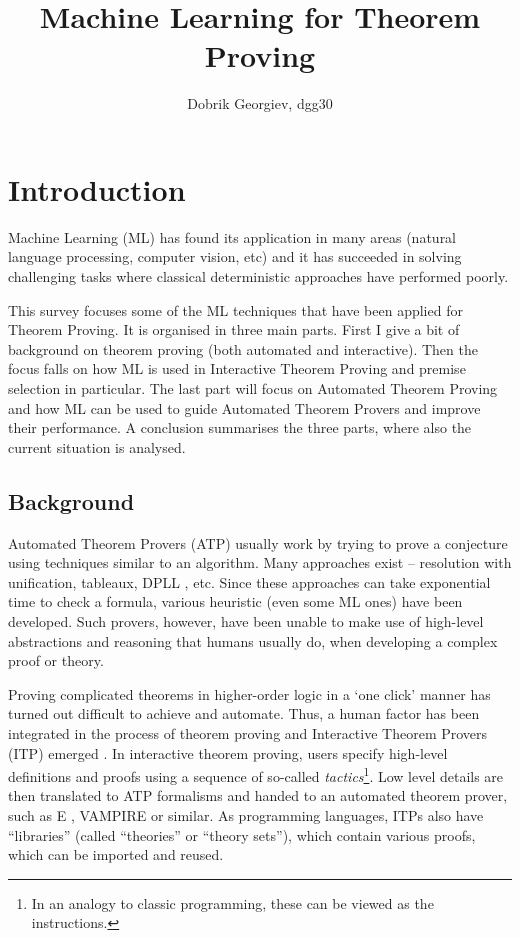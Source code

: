 \documentclass{article}
\title{Machine Learning for Theorem Proving}
\author{Dobrik Georgiev, dgg30}
\begin{document}
\maketitle

\section{Introduction}

Machine Learning (ML) has found its application in many areas (natural language
processing, computer vision, etc) and it has succeeded in solving challenging
tasks where classical deterministic approaches have performed poorly.

This survey focuses some of the ML techniques that have been applied for
Theorem Proving. It is organised in three main parts. First I give a bit of
background on theorem proving (both automated and interactive). Then the focus
falls on how ML is used in Interactive Theorem Proving and premise selection in
particular. The last part will focus on Automated Theorem Proving and how ML
can be used to guide Automated Theorem Provers and improve their performance.
A conclusion summarises the three parts, where also the current situation is
analysed.

\nocite{LearningToProveITP}


\subsection{Background}

Automated Theorem Provers (ATP) usually work by trying to prove a conjecture
using techniques similar to an algorithm. Many approaches exist -- resolution
with unification, tableaux, DPLL \citep{DPLL}, etc. Since these approaches can
take exponential time to check a formula, various heuristic (even some ML ones)
have been developed. Such provers, however, have been unable to make use of
high-level abstractions and reasoning that humans usually do, when developing
a complex proof or theory.

Proving complicated theorems in higher-order logic in a `one click' manner has
turned out difficult to achieve and automate. Thus, a human factor has been
integrated in the process of theorem proving and Interactive Theorem Provers
(ITP) emerged \citep{HistoryITP}. In interactive theorem proving, users specify
high-level definitions and proofs using a sequence of so-called
\textit{tactics}\footnote{In an analogy to classic programming, these can be
viewed as the instructions.}. Low level details are then translated to ATP formalisms and handed
to an automated theorem prover, such as E \citep{Eprover}, VAMPIRE
\citep{VAMPIRE} or similar. As programming languages, ITPs also have
``libraries'' (called ``theories'' or ``theory sets''), which contain various
proofs, which can be imported and reused.
\end{document}
